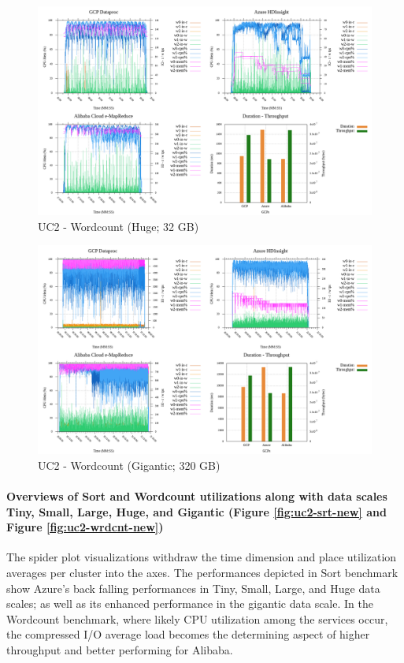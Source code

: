 \documentclass[review]{elsarticle}
\begin{document}
\begin{figure}[p]
	\caption{UC2 - Wordcount (Huge; 32 GB)}
	\label{fig:uc2-wrdcnt-h-cmidt}
	\includegraphics[width=\textwidth]{uc2-wrdcnt-h-cmidt}
	\centering
\end{figure}

\begin{figure}[p]
	\caption{UC2 - Wordcount (Gigantic; 320 GB)}
	\label{fig:uc2-wrdcnt-g-cmidt}
	\includegraphics[width=\textwidth]{uc2-wrdcnt-g-cmidt}
	\centering
\end{figure}

\paragraph{Overviews of Sort and Wordcount utilizations along with data scales Tiny, Small, Large, Huge, and Gigantic (Figure \ref{fig:uc2-srt-new} and Figure \ref{fig:uc2-wrdcnt-new})}The spider plot visualizations withdraw the time dimension and place utilization averages per cluster into the axes. The performances depicted in Sort benchmark show Azure's back falling performances in Tiny, Small, Large, and Huge data scales; as well as its enhanced performance in the gigantic data scale. In the Wordcount benchmark, where likely CPU utilization among the services occur, the compressed I/O average load becomes the determining aspect of higher throughput and better performing for Alibaba.
\end{document}
